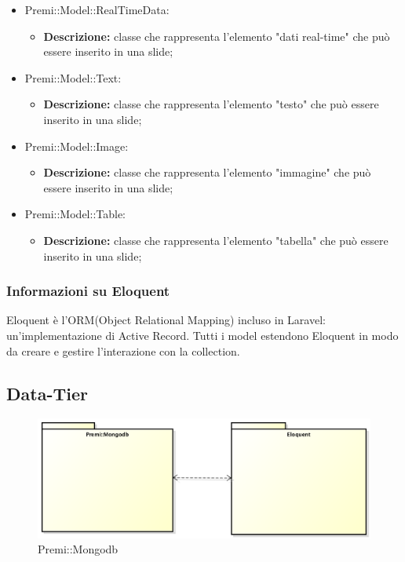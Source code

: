 \begin{itemize}
		\item Premi::Model::RealTimeData:
		\begin{itemize}
			\item \textbf{Descrizione:} classe che rappresenta l'elemento "dati real-time" che può essere inserito in una \gls{slide};
		\end{itemize}
		
		\item Premi::Model::Text:
		\begin{itemize}
			\item \textbf{Descrizione:} classe che rappresenta l'elemento "testo" che può essere inserito in una \gls{slide};
		\end{itemize}
		
		\item Premi::Model::Image:
		\begin{itemize}
			\item \textbf{Descrizione:} classe che rappresenta l'elemento "immagine" che può essere inserito in una \gls{slide};
		\end{itemize}
		
		\item Premi::Model::Table:
		\begin{itemize}
			\item \textbf{Descrizione:} classe che rappresenta l'elemento "tabella" che può essere inserito in una \gls{slide};
		\end{itemize}
	\end{itemize}
	
\subsubsection*{Informazioni su Eloquent}
Eloquent è l'ORM(Object Relational Mapping) incluso in Laravel: un'implementazione di Active Record. Tutti i model estendono  Eloquent in modo da creare e gestire l'interazione con la collection.


\newpage
\subsection{Data-Tier}
\begin{figure}[h]
\centering
\includegraphics[width=0.7\linewidth]{img/premi_mongodb}
\caption[Premi::Mongodb]{Premi::Mongodb}
\label{fig:premi_mongodb}
\end{figure}
